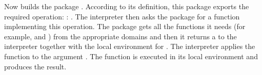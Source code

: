 Now \Language{} builds the package
.
According to its definition, this package exports the required
operation:
: .
The interpreter then asks the package for a function implementing
this operation.
The package gets all the functions it needs (for example,
 and ) from the appropriate
domains and then it
returns a  to the interpreter together with
the local environment for .
The interpreter applies the function to the argument \spad{[1,-5,3]}.
The  function is executed in its local
environment and produces the result.
